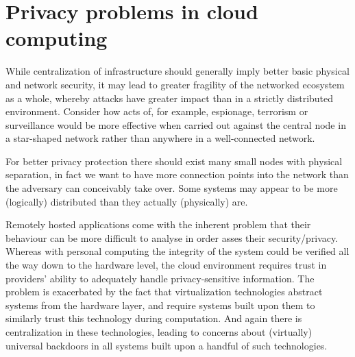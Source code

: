 \documentclass[11pt]{article}
\begin{document}
\section{Privacy problems in cloud computing}
\label{sec:problems_in_cloud_computing}

While centralization of infrastructure should generally imply better basic physical and network security, it may lead to greater fragility of the networked ecosystem as a whole, whereby attacks have greater impact than in a strictly distributed environment.
Consider how acts of, for example, espionage, terrorism or surveillance would be more effective when carried out against the central node in a star-shaped network rather than anywhere in a well-connected network.

For better privacy protection there should exist many small nodes with physical separation, in fact we want to have more connection points into the network than the adversary can conceivably take over.
Some systems may appear to be more (logically) distributed than they actually (physically) are. 

Remotely hosted applications come with the inherent problem that their behaviour can be more difficult to analyse in order asses their security/privacy.
Whereas with personal computing the integrity of the system could be verified all the way down to the hardware level, the cloud environment requires trust in providers' ability to adequately handle privacy-sensitive information.
The problem is exacerbated by the fact that virtualization technologies abstract systems from the hardware layer, and require systems built upon them to similarly trust this technology during computation.
And again there is centralization in these technologies, leading to concerns about (virtually) universal backdoors in all systems built upon a handful of such technologies.
\cite{chow2009controlling}


\end{document}

